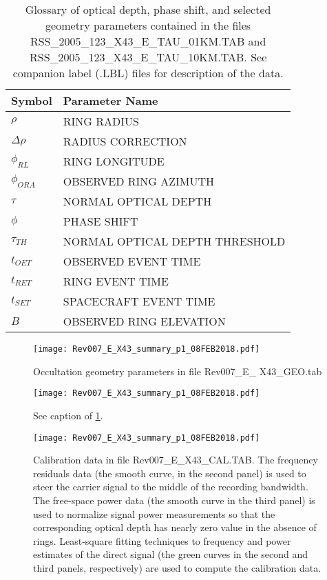 \documentclass[crop=false,class=book]{standalone}
\begin{document}
\begin{table}[H]
    \centering
    \begin{tabular}{l l}
        \hline
        Symbol			& Parameter Name \\
        \hline
        $\rho$			& RING RADIUS \\
        $\Delta\rho$		& RADIUS CORRECTION \\
        $\phi_{RL}$		& RING LONGITUDE \\
        $\phi_{ORA}$		& OBSERVED RING AZIMUTH \\
        $\tau$			& NORMAL OPTICAL DEPTH \\
        $\phi$			& PHASE SHIFT \\
        $\tau_{TH}$		& NORMAL OPTICAL DEPTH THRESHOLD \\
        $t_{OET}$			& OBSERVED EVENT TIME \\
        $t_{RET}$			& RING EVENT TIME \\
        $t_{SET}$			& SPACECRAFT EVENT TIME \\
        $B$				& OBSERVED RING ELEVATION \\
        \hline
    \end{tabular}
    \caption[Easy Data Parameters for Tau File]{Glossary of optical depth, phase shift, and selected geometry parameters contained in the files RSS\_2005\_123\_X43\_E\_TAU\_01KM.TAB and RSS\_2005\_123\_X43\_E\_TAU\_10KM.TAB. See companion label (.LBL) files for description of the data.}
\end{table}
\begin{figure}[H]
	    \centering
        \texttt{[image: Rev007\_E\_X43\_summary\_p1\_08FEB2018.pdf]}
	        \caption[Occultation Geometry]{Occultation geometry parameters in file Rev007\_E\_ X43\_GEO.tab}
	        \label{fig:easy_dqata_fig_occultation_geo_parameters_inf_file_rev007_E_X43_geo_tab}
\end{figure}
\begin{figure}[H]
        \texttt{[image: Rev007\_E\_X43\_summary\_p1\_08FEB2018.pdf]}
	        \caption[More Occultation Geometry]{See caption of \ref{fig:easy_dqata_fig_occultation_geo_parameters_inf_file_rev007_E_X43_geo_tab}.}
	\end{figure}
\begin{figure}[H]
    \centering
    \texttt{[image: Rev007\_E\_X43\_summary\_p1\_08FEB2018.pdf]}
	    \caption[Calibration Data contained in the Easy Data]{Calibration data in file Rev007\_E\_X43\_CAL.TAB. The frequency residuals data (the smooth curve, in the second panel) is used to steer the carrier signal to the middle of the recording bandwidth. The free-space power data (the smooth curve in the third panel) is used to normalize signal power measurements so that the corresponding optical depth has nearly zero value in the absence of rings. Least-square fitting techniques to frequency and power estimates of the direct signal (the green curves in the second and third panels, respectively) are used to compute the calibration data.}
\end{figure}
\end{document}
